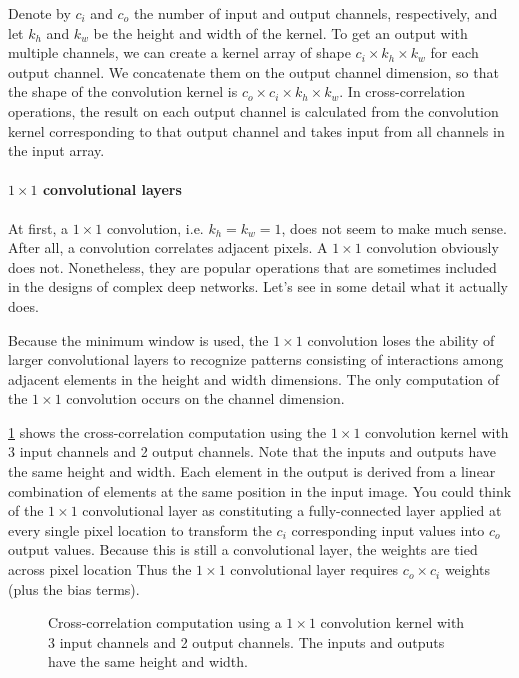 Denote by $c_i$ and $c_o$  the number of input and output channels, respectively, and let $k_h$ and $k_w$ be the height and width of the kernel. To get an output with multiple channels, we can create a kernel array of shape $c_i \times k_h \times k_w$ for each output channel. We concatenate them on the output channel dimension, so that the shape of the convolution kernel is $c_o \times c_i \times k_h \times k_w$. In cross-correlation operations, the result on each output channel is calculated from the convolution kernel corresponding to that output channel and takes input from all channels in the input array.

\paragraph{$1 \times 1$ convolutional layers}

At first, a $1 \times 1$  convolution, i.e.  $k_h=k_w=1$, does not seem to make much sense. After all, a convolution correlates adjacent pixels. A $1 \times 1$ convolution obviously does not. Nonetheless, they are popular operations that are sometimes included in the designs of complex deep networks. Let’s see in some detail what it actually does.

Because the minimum window is used, the $1 \times 1$ convolution loses the ability of larger convolutional layers to recognize patterns consisting of interactions among adjacent elements in the height and width dimensions. The only computation of the $1 \times 1$ convolution occurs on the channel dimension.

\cref{fig:conv_1x1} shows the cross-correlation computation using the $1 \times 1$ convolution kernel with 3 input channels and 2 output channels. Note that the inputs and outputs have the same height and width. Each element in the output is derived from a linear combination of elements at the same position in the input image. You could think of the $1 \times 1$  convolutional layer as constituting a fully-connected layer applied at every single pixel location to transform the $c_i$ corresponding input values into $c_o$ output values. Because this is still a convolutional layer, the weights are tied across pixel location Thus the $1 \times 1$  convolutional layer requires $c_o \times c_i$ weights (plus the bias terms).

\begin{figure}[hpt]
	\centering
	
	\caption{Cross-correlation computation using a $1 \times 1$ convolution kernel with 3 input channels and 2 output channels. The inputs and outputs have the same height and width.}
	\label{fig:conv_1x1}
\end{figure}

